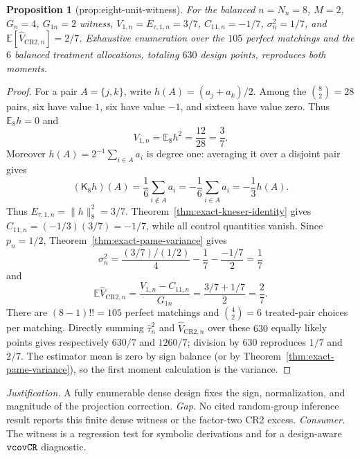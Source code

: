 \documentclass{article}
\newtheorem{proposition}{Proposition}
\begin{document}
\begin{proposition}[prop:eight-unit-witness]\label{prop:eight-unit-witness}
For the balanced \(n=N_n=8\), \(M=2\), \(G_n=4\), \(G_{1n}=2\) witness, \(V_{1,n}=E_{\tau,1,n}=3/7\), \(C_{11,n}=-1/7\), \(\sigma_n^2=1/7\), and \(\mathbb E[\widehat V_{\mathrm{CR2},n}]=2/7\). Exhaustive enumeration over the \(105\) perfect matchings and the \(6\) balanced treatment allocations, totaling \(630\) design points, reproduces both moments.
\end{proposition}
\begin{proof}
For a pair \(A=\{j,k\}\), write \(h(A)=(a_j+a_k)/2\).  Among the \(\binom82=28\) pairs, six have value \(1\), six have value \(-1\), and sixteen have value zero.  Thus \(\mathbb E_8h=0\) and
\[
 V_{1,n}=\mathbb E_8h^2=\frac{12}{28}=\frac37.
\]
Moreover \(h(A)=2^{-1}\sum_{i\in A}a_i\) is degree one: averaging it over a disjoint pair gives
\[
 (\mathsf K_8h)(A)=\frac1{6}\sum_{i\notin A}a_i
 =-\frac1{6}\sum_{i\in A}a_i=-\frac13h(A).
\]
Thus \(E_{\tau,1,n}=\|h\|_8^2=3/7\).  Theorem~\ref{thm:exact-kneser-identity} gives \(C_{11,n}=(-1/3)(3/7)=-1/7\), while all control quantities vanish.  Since \(p_n=1/2\), Theorem~\ref{thm:exact-pame-variance} gives
\[
 \sigma_n^2=\frac{(3/7)/(1/2)}4-\frac17-\frac{-1/7}{2}=\frac17
\]
and
\[
 \mathbb E\widehat V_{\mathrm{CR2},n}
 =\frac{V_{1,n}-C_{11,n}}{G_{1n}}
 =\frac{3/7+1/7}{2}=\frac27.
\]
There are \((8-1)!!=105\) perfect matchings and \(\binom42=6\) treated-pair choices per matching.  Directly summing \(\widehat\tau_n^2\) and \(\widehat V_{\mathrm{CR2},n}\) over these \(630\) equally likely points gives respectively \(630/7\) and \(1260/7\); division by \(630\) reproduces \(1/7\) and \(2/7\).  The estimator mean is zero by sign balance (or by Theorem~\ref{thm:exact-pame-variance}), so the first moment calculation is the variance.
\end{proof}
\par\smallskip\noindent \textit{Justification.} A fully enumerable dense design fixes the sign, normalization, and magnitude of the projection correction. \textit{Gap.} No cited random-group inference result reports this finite dense witness or the factor-two CR2 excess. \textit{Consumer.} The witness is a regression test for symbolic derivations and for a design-aware \({\tt vcovCR}\) diagnostic.
\end{document}
